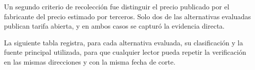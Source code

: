 Un segundo criterio de recolección fue distinguir el precio publicado por el fabricante del precio estimado por terceros. Solo dos de las alternativas evaluadas publican tarifa abierta, y en ambos casos se capturó la evidencia directa.


La siguiente tabla registra, para cada alternativa evaluada, su clasificación y la fuente principal utilizada, para que cualquier lector pueda repetir la verificación en las mismas direcciones y con la misma fecha de corte.

